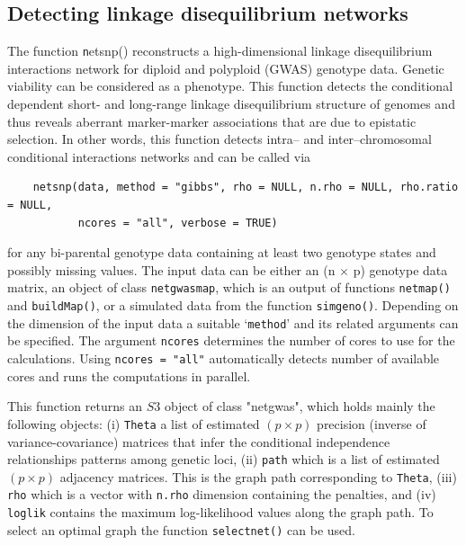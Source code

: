 \subsection{Detecting linkage disequilibrium networks}
\label{marker-marker network}
The function \texttt netsnp() reconstructs a high-dimensional linkage disequilibrium interactions network for diploid and polyploid (GWAS) genotype data. Genetic viability can be considered as a phenotype. This function detects the conditional dependent short- and long-range linkage disequilibrium structure of genomes and thus reveals aberrant marker-marker associations that are due to epistatic selection. In other words, this function detects intra-- and inter--chromosomal conditional interactions networks and can be called via
\begin{verbatim}
	netsnp(data, method = "gibbs", rho = NULL, n.rho = NULL, rho.ratio = NULL,
	       ncores = "all", verbose = TRUE)
\end{verbatim}
for any bi-parental genotype data containing at least two genotype states and possibly missing values. The input data can be either an (n $\times$ p) genotype data matrix, an object of class {\tt netgwasmap}, which is an output of functions {\tt netmap()} and {\tt buildMap()}, or a simulated data from the function {\tt simgeno()}. Depending on the dimension of the input data a suitable `{\tt method}' and its related arguments can be specified. The argument {\tt ncores} determines the number of cores to use for the calculations. Using {\tt ncores = "all"} automatically detects number of available cores and runs the computations in parallel.

This function returns an $S3$ object of class "netgwas", which holds mainly the following objects: (i) {\tt Theta} a list of estimated $(p \times p)$ precision (inverse of variance-covariance) matrices that infer the conditional independence relationships patterns among genetic loci, (ii) {\tt path} which is a list of estimated  $(p \times p)$ adjacency matrices. This is the graph path corresponding to {\tt Theta}, (iii) {\tt rho} which is a vector with {\tt n.rho} dimension containing the penalties, and (iv) {\tt loglik} contains the maximum log-likelihood values along the graph path. To select an optimal graph the function {\tt selectnet()} can be used.

